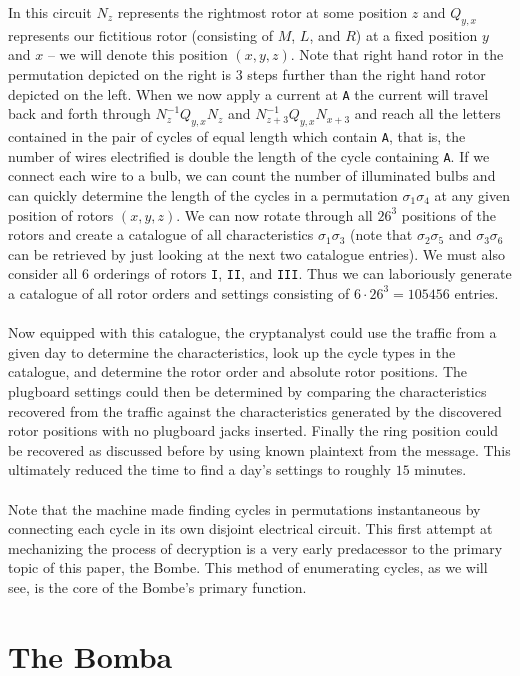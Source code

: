 In this circuit $N_z$ represents the rightmost rotor at some position
$z$ and $Q_{y,x}$ represents our fictitious rotor (consisting of $M$,
$L$, and $R$) at a fixed position $y$ and $x$ -- we will denote this
position $(x,y,z)$. Note that right hand
rotor in the permutation depicted on the right is 3 steps further
than the right hand rotor depicted on the left. When we now apply a
current at \texttt{A} the current will travel back and forth through
$N^{-1}_zQ_{y,x}N_z$ and $N^{-1}_{z+3}Q_{y,x}N_{x+3}$ and reach all
the letters contained
in the pair of cycles of equal length which contain \texttt{A}, that
is, the number of wires electrified is double the length of the cycle
containing \texttt{A}. If we connect each wire to a bulb, we can
count the number of illuminated bulbs and can quickly determine the length of
the cycles in a permutation $\sigma_1\sigma_{4}$ at any given
position of rotors $(x,y,z)$. We can now rotate through all
$26^3$ positions of the rotors and create a catalogue of all
characteristics $\sigma_1\sigma_3$ (note that $\sigma_2\sigma_5$ and
$\sigma_3\sigma_6$ can be retrieved by just looking at the next two
catalogue entries). We must also consider all 6 orderings of rotors
\texttt{I}, \texttt{II}, and \texttt{III}. Thus we can laboriously
generate a catalogue of all rotor orders and settings consisting of
$6\cdot 26^3 = 105456$ entries.
\\\\Now equipped with this catalogue, the cryptanalyst could use the
traffic from a given day to determine the characteristics, look up
the cycle types in the catalogue, and determine the rotor order and
absolute rotor positions. The plugboard settings could then be
determined by comparing the characteristics recovered from the
traffic against the characteristics generated by the discovered rotor
positions with no plugboard jacks inserted. Finally the ring position
could be recovered as discussed before by using known plaintext from
the message. This ultimately reduced the time to find a day's
settings to roughly $15$ minutes.
\\\\Note that the machine made finding cycles in permutations
instantaneous by connecting each cycle in its own disjoint electrical
circuit. This first attempt at mechanizing the process of decryption
is a very early predacessor to the primary topic of this paper, the
Bombe. This method of enumerating cycles, as we will see, is the core
of the Bombe's primary function.
\section{The Bomba}

